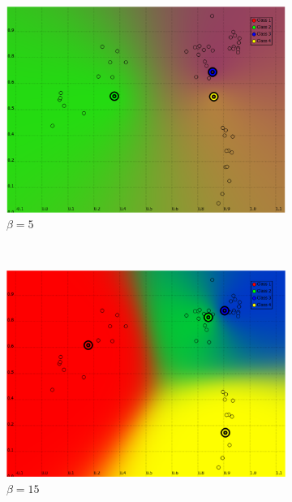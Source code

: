 \documentclass[a4paper,10pt]{article}
\begin{document}
\begin{figure}[H]
\centering
    \begin{subfigure}[t]{0.2\textwidth}
      \centering
      \includegraphics[width=\textwidth]{pictures/dataset_1_soft-Kmeans-4K-beta5}
      \caption{$\beta = 5$}
      \label{fig:dataset_1_soft-Kmeans-4K-beta5}
     \end{subfigure}
      ~
    \begin{subfigure}[t]{0.2\textwidth}
      \centering
      \includegraphics[width=\textwidth]{pictures/dataset_1_soft-Kmeans-4K-beta15}
      \caption{$\beta = 15$}
      \label{fig:dataset_1_soft-Kmeans-4K-beta15}
     \end{subfigure}
      ~
    \begin{subfigure}[t]{0.2\textwidth}

\end{subfigure}
\end{figure}
\end{document}
